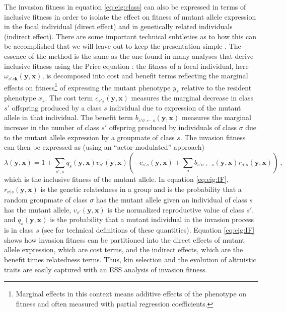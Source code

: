 \documentclass[11pt]{article}
\renewcommand{\vec}[1]{\symbf{#1}}
\newcommand{\eig}{\lambda}
\begin{document}
The invasion fitness in equation \eqref{eq:eig:class} can also be expressed in terms of inclusive fitness in order to isolate the effect on fitness of mutant allele expression in the focal individual (direct effect) and in genetically related individuals (indirect effect). There are some important technical subtleties as to how this can be accomplished that we will leave out to keep the presentation simple \cite[see ``Supplement B'' in][for details]{Lehmann:Rousset:2020}. The essence of the method is the same as the one found in many analyses that derive inclusive fitness using the Price equation \cite[e.g.,][]{Queller:1992,Frank:1998,Lehmann:Keller:2006,Akcay:VanCleve:2012}: the fitness of a focal individual, here $\omega_{s'\!s\vec{k}}(\vec{y}, \vec{x})$, is decomposed into cost and benefit terms reflecting the marginal effects on fitness\footnote{Marginal effects in this context means additive effects of the phenotype on fitness and often measured with partial regression coefficients.} of expressing the mutant phenotype $y_{s}$ relative to the resident phenotype $x_{s}$. The cost term $c_{s'\!s}(\vec{y}, \vec{x})$ measures the marginal decrease in class $s'$ offspring produced by a class $s$ individual due to expression of the mutant allele in that individual. The benefit term $b_{s'\!\sigma \leftarrow s}(\vec{y}, \vec{x})$ measures the marginal increase in the number of class $s'$ offspring produced by individuals of class $\sigma$ due to the mutant allele expression by a groupmate of class $s$. The invasion fitness can then be expressed as (using an ``actor-modulated'' approach) \cite{Lehmann:Rousset:2020}
\begin{equation}
  \label{eq:eig:IF}
  \eig(\vec{y}, \vec{x}) = 1 + \sum_{s'\!,s} q_{s}(\vec{y}, \vec{x}) v_{s'}(\vec{y}, \vec{x})
  \left( - c_{s'\!s}(\vec{y}, \vec{x}) + \sum_{\sigma} b_{s'\!\sigma \leftarrow s}(\vec{y}, \vec{x}) r_{\sigma|s}(\vec{y}, \vec{x}) \right) \: ,
\end{equation}
which is the inclusive fitness \cite{Hamilton:1964} of the mutant allele. In equation \eqref{eq:eig:IF}, $r_{\sigma|s}(\vec{y}, \vec{x})$ is the genetic relatedness in a group and is the probability that a random groupmate of class $\sigma$ has the mutant allele given an individual of class $s$ has the mutant allele, $v_{s'}(\vec{y}, \vec{x})$ is the normalized reproductive value of class $s'$, and $q_{s}(\vec{y}, \vec{x})$ is the probability that a mutant individual in the invasion process is in class $s$ (see \cite{Lehmann:Rousset:2020} for technical definitions of these quantities). Equation \eqref{eq:eig:IF} shows how invasion fitness can be partitioned into the direct effects of mutant allele expression, which are cost terms, and the indirect effects, which are the benefit times relatedness terms. Thus, kin selection and the evolution of altruistic traits are easily captured with an ESS analysis of invasion fitness.
\end{document}
